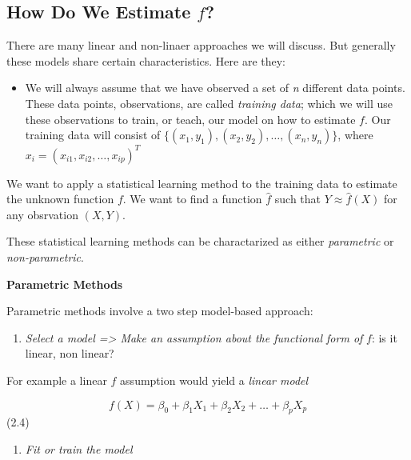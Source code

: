 \documentclass[
  letterpaper,
  DIV=11,
  numbers=noendperiod]{scrreprt}
\providecommand{\tightlist}{%
  \setlength{\itemsep}{0pt}\setlength{\parskip}{0pt}}\usepackage{longtable,booktabs,array}
\begin{document}
\hypertarget{how-do-we-estimate-f}{%
\subsection{\texorpdfstring{How Do We Estimate
\(f\)?}{How Do We Estimate f?}}\label{how-do-we-estimate-f}}

There are many linear and non-linaer approaches we will discuss. But
generally these models share certain characteristics. Here are they:

\begin{itemize}
\tightlist
\item
  We will always assume that we have observed a set of \emph{n}
  different data points. These data points, observations, are called
  \emph{training data}; which we will use these observations to train,
  or teach, our model on how to estimate \(f\). Our training data will
  consist of \(\{(x_1,y_1), (x_2,y_2), \dots, (x_n,y_n)\}\), where
  \(x_i = (x_{i1}, x_{i2}, \dots, x_{ip})^T\)
\end{itemize}

We want to apply a statistical learning method to the training data to
estimate the unknown function \(f\). We want to find a function
\(\hat{f}\) such that \(Y \approx \hat{f}(X)\) for any obsrvation
\((X,Y)\).

These statistical learning methods can be charactarized as either
\emph{parametric} or \emph{non-parametric}.

\textbf{Parametric Methods}

Parametric methods involve a two step model-based approach:

\begin{enumerate}
\def\labelenumi{\arabic{enumi}.}
\tightlist
\item
  \emph{Select a model =\textgreater{} Make an assumption about the
  functional form of} \(f\): is it linear, non linear?
\end{enumerate}

For example a linear \(f\) assumption would yield a \emph{linear model}

\[
  f(X) = \beta_0 + \beta_1X_1 + \beta_2X_2 + \dots + \beta_pX_p
  \] (2.4)

\begin{enumerate}
\def\labelenumi{\arabic{enumi}.}
\setcounter{enumi}{1}
\tightlist
\item
  \emph{\emph{Fit} or \emph{train} the model}
\end{enumerate}
\end{document}
